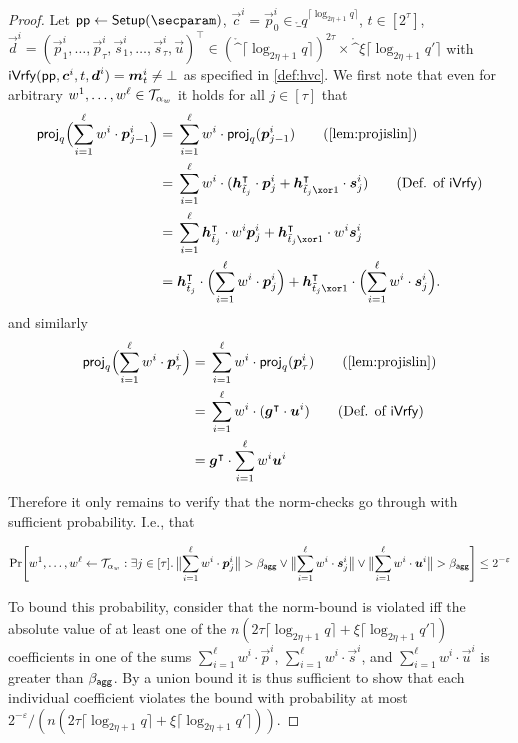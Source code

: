 \begin{proof}
Let $\params \gets \setup(\secparam)$, $\vec{c}^i = \vec{p}_0^i \in \ring_q^{\lceil\log_{2\eta+1} q\rceil}$, $t\in[2^\tau]$, $\vec{d}^i = (\vec{p}^i_1,\dots,\vec{p}^i_{\tau},\vec{s}^i_1, \dots, \vec{s}^i_{\tau},\vec{u})^\intercal\in (\ring^{\lceil\log_{2\eta+1} q\rceil})^{2\tau} \times \ring^{\xi\lceil\log_{2\eta+1} q'\rceil}$ with $\mathsf{iVrfy}(\mathsf{pp},\boldsymbol{c}^i,t,\boldsymbol{d}^i) = \boldsymbol{m}_t^i \neq \bot$
as specified in \autoref{def:hvc}.
%
We first note that even for arbitrary $w^1,\dots,w^{\ell}\in\mathcal{T}_{\alpha_w}$ it holds for all $j\in[\tau]$ that
\begin{align*}
  \proj_q\Bigl(\sum_{i=1}^{\ell}w^i\cdot\vec{p}_{j-1}^i\Bigr) ={}&\sum_{i=1}^{\ell}w^i\cdot\proj_q(\vec{p}_{j-1}^i)\tag{\autoref{lem:projislin}}\\
  ={}&\sum_{i=1}^{\ell}w^i\cdot(\vec{h}_{\tilde t_j}^\intercal\cdot \vec{p}^i_{j} + \vec{h}_{\tilde t_j\xor 1}^\intercal \cdot \vec{s}^i_{j})\tag{Def. of $\iverify$}\\
  ={}&\sum_{i=1}^{\ell}\vec{h}_{\tilde t_j}^\intercal\cdot w^i \vec{p}^i_{j} + \vec{h}_{\tilde t_j\xor 1}^\intercal\cdot w^i  \vec{s}^i_{j}\\  
  ={}& \vec{h}_{\tilde t_j}^\intercal\cdot \Bigl(\sum_{i=1}^{\ell}w^i\cdot\vec{p}^i_{j}\Bigr) + \vec{h}_{\tilde t_j \xor 1}^\intercal \cdot \Bigl(\sum_{i=1}^{\ell}w^i\cdot\vec{s}^i_{j}\Bigr).
\end{align*}
and similarly
\begin{align*}
  \proj_q\Bigl(\sum_{i=1}^{\ell}w^i\cdot\vec{p}_{\tau}^i\Bigr) ={}&\sum_{i=1}^{\ell}w^i\cdot\proj_q(\vec{p}_{\tau}^i)\tag{\autoref{lem:projislin}}\\
  ={}&\sum_{i=1}^{\ell}w^i\cdot(\vec{g}^\intercal\cdot \vec{u}^i)\tag{Def. of $\iverify$}\\
  ={}&\vec{g}^\intercal\cdot\sum_{i=1}^{\ell}w^i\vec{u}^i 
\end{align*}
Therefore it only remains to verify that the norm-checks go through with sufficient probability. I.e., that

\[
    \Pr\mleft[
      w^1,\dots,w^{\ell} \gets \tern_{\alpha_w} : \exists j\in[\tau]\ldotp
      \bigl\Vert\sum_{i=1}^{\ell}w^i\cdot \vec{p}_j^i\bigr\Vert > \bagg \lor \bigl\Vert\sum_{i=1}^{\ell}w^i\cdot \vec{s}_j^i\bigr\Vert \lor \bigl\Vert\sum_{i=1}^{\ell}w^i\cdot\vec{u}^i\bigr\Vert > \bagg
    \mright] \leq 2^{-\varepsilon}
  \]
  
  To bound this probability, consider that the norm-bound is violated iff the absolute value of at least one of the $n(2\tau\lceil\log_{2\eta+1} q\rceil  + \xi\lceil\log_{2\eta+1} q'\rceil)$ coefficients in one of the sums $\sum_{i=1}^{\ell} w^i\cdot\vec{p}^i$, $\sum_{i=1}^{\ell} w^i\cdot\vec{s}^i$, and $\sum_{i=1}^{\ell} w^i\cdot\vec{u}^i$ is greater than $\beta_{\mathsf{agg}}$.
  By a union bound it is thus sufficient to show that each individual coefficient violates the bound with probability at most $2^{-\varepsilon}/(n(2\tau\lceil\log_{2\eta+1} q\rceil + \xi\lceil\log_{2\eta+1} q'\rceil))$.
  

\end{proof}

